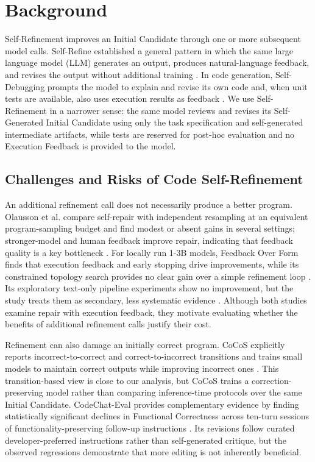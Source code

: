 \section{Background}

Self-Refinement improves an Initial Candidate through one or more subsequent model calls.
Self-Refine established a general pattern in which the same large language model (LLM) generates an output, produces natural-language feedback, and revises the output without additional training \cite{madaan2023selfrefine}.
In code generation, Self-Debugging prompts the model to explain and revise its own code and, when unit tests are available, also uses execution results as feedback \cite{chen2024selfdebug}.
We use Self-Refinement in a narrower sense: the same model reviews and revises its Self-Generated Initial Candidate using only the task specification and self-generated intermediate artifacts, while tests are reserved for post-hoc evaluation and no Execution Feedback is provided to the model.

\subsection{Challenges and Risks of Code Self-Refinement}

An additional refinement call does not necessarily produce a better program.
Olausson et al. compare self-repair with independent resampling at an equivalent program-sampling budget and find modest or absent gains in several settings; stronger-model and human feedback improve repair, indicating that feedback quality is a key bottleneck \cite{olausson2024selfrepair}.
For locally run 1-3B models, Feedback Over Form finds that execution feedback and early stopping drive improvements, while its constrained topology search provides no clear gain over a simple refinement loop \cite{mcandrews2026feedback}.
Its exploratory text-only pipeline experiments show no improvement, but the study treats them as secondary, less systematic evidence \cite{mcandrews2026feedback}.
Although both studies examine repair with execution feedback, they motivate evaluating whether the benefits of additional refinement calls justify their cost.

Refinement can also damage an initially correct program.
CoCoS explicitly reports incorrect-to-correct and correct-to-incorrect transitions and trains small models to maintain correct outputs while improving incorrect ones \cite{cho-etal-2025-self}.
This transition-based view is close to our analysis, but CoCoS trains a correction-preserving model rather than comparing inference-time protocols over the same Initial Candidate.
CodeChat-Eval provides complementary evidence by finding statistically significant declines in Functional Correctness across ten-turn sessions of functionality-preserving follow-up instructions \cite{guo2026codechateval}.
Its revisions follow curated developer-preferred instructions rather than self-generated critique, but the observed regressions demonstrate that more editing is not inherently beneficial.

